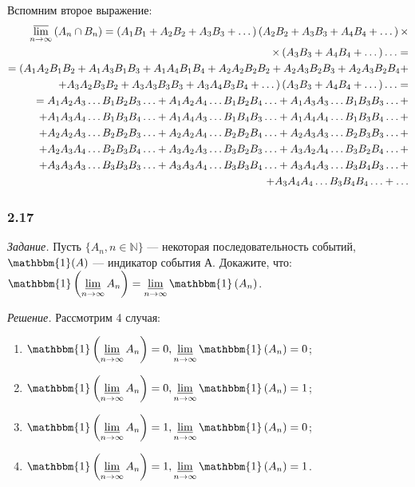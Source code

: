 \documentclass{book}
\begin{document}
Вспомним второе выражение:
\begin{equation*}
\begin{split}
\varlimsup\limits_{n\to\infty}\left(A_n\cap B_n\right)=
\left( A_1 B_1 + A_2 B_2 + A_3 B_3 + \dotsc \right) \left( A_2 B_2 + A_3 B_3 + A_4 B_4 + \dotsc \right) \times \\
\times \left(A_3 B_3 + A_4 B_4 + \dotsc \right) \dotsc = \\
= ( A_1 A_2 B_1 B_2 + A_1 A_3 B_1 B_3 + A_1 A_4 B_1 B_4 + A_2 A_2 B_2 B_2 + A_2 A_3 B_2 B_3 + A_2 A_3 B_2 B_4 + \\
+ A_3 A_2 B_3 B_2 + A_3 A_3 B_3 B_3 + A_3 A_4 B_3 B_4 + \dotsc) \left(A_3 B_3 + A_4 B_4 + \dotsc  \right) \dotsc = \\
= A_1 A_2 A_3 \dotsc B_1 B_2 B_3 \dotsc + A_1 A_2 A_4 \dotsc B_1 B_2 B_4 \dotsc + A_1 A_3 A_3 \dotsc B_1 B_3 B_3 \dotsc + \\
+ A_1 A_3 A_4 \dotsc B_1 B_3 B_4 \dotsc + A_1 A_4 A_3 \dotsc B_1 B_4 B_3 \dotsc + A_1 A_4 A_4 \dotsc B_1 B_3 B_4 \dotsc + \\
+ A_2 A_2 A_3 \dotsc B_2 B_2 B_3 \dotsc + A_2 A_2 A_4 \dotsc B_2 B_2 B_4 \dotsc + A_2 A_3 A_3 \dotsc B_2 B_3 B_3 \dotsc + \\
+ A_2 A_3 A_4 \dotsc B_2 B_3 B_4 \dotsc + A_3 A_2 A_3 \dotsc B_3 B_2 B_3 \dotsc + A_3 A_2 A_4 \dotsc B_3 B_2 B_4 \dotsc + \\
+ A_3 A_3 A_3 \dotsc B_3 B_3 B_3 \dotsc + A_3 A_3 A_4 \dotsc B_3 B_3 B_4 \dotsc + A_3 A_4 A_3 \dotsc B_3 B_4 B_3 \dotsc + \\
+ A_3 A_4 A_4 \dotsc B_3 B_4 B_4 \dotsc + \dotsc
\end{split}
\end{equation*}

\subsubsection*{2.17}

\textit{Задание.} Пусть $\{A_n, n\in\mathbb{N}\}$ --- некоторая последовательность событий, $\mathbbm{1}(A)$ --- индикатор события А. Докажите, что: $\mathbbm{1}\left(\varliminf\limits_{n\to\infty}A_n\right)=\varliminf\limits_{n\to\infty}\mathbbm{1}\left(A_n\right)$.

\textit{Решение.} Рассмотрим 4 случая:
\begin{enumerate}
\item $\mathbbm{1}\left(\varliminf\limits_{n\to\infty}A_n\right)=0, \varliminf\limits_{n\to\infty}\mathbbm{1}\left(A_n\right)=0$;
\item $\mathbbm{1}\left(\varliminf\limits_{n\to\infty}A_n\right)=0, \varliminf\limits_{n\to\infty}\mathbbm{1}\left(A_n\right)=1$;
\item $\mathbbm{1}\left(\varliminf\limits_{n\to\infty}A_n\right)=1, \varliminf\limits_{n\to\infty}\mathbbm{1}\left(A_n\right)=0$;
\item $\mathbbm{1}\left(\varliminf\limits_{n\to\infty}A_n\right)=1, \varliminf\limits_{n\to\infty}\mathbbm{1}\left(A_n\right)=1$.
\end{enumerate}
\end{document}
